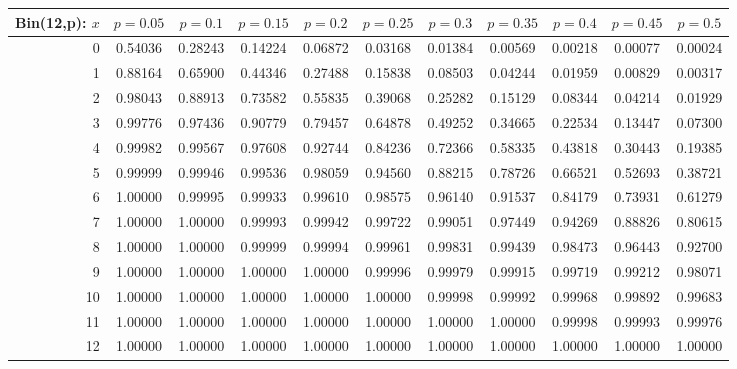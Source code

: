 \documentclass{article}
\begin{document}
{\vspace{8pt minus 6pt}
\begin{tabular}{@{\extracolsep{-2pt}}|r|c|c|c|c|c|c|c|c|c|c|}
\hline
Bin(12,p): $x$
   & $p\!=\!0.05$& $p\!=\!0.1$& $p\!=\!0.15$& $p\!=\!0.2$& $p\!=\!0.25$& $p\!=\!0.3$& $p\!=\!0.35$& $p\!=\!0.4$& $p\!=\!0.45$& $p\!=\!0.5$\\\hline
  0&0.54036&0.28243&0.14224&0.06872&0.03168&0.01384&0.00569&0.00218&0.00077&0.00024\\
  1&0.88164&0.65900&0.44346&0.27488&0.15838&0.08503&0.04244&0.01959&0.00829&0.00317\\
  2&0.98043&0.88913&0.73582&0.55835&0.39068&0.25282&0.15129&0.08344&0.04214&0.01929\\
  3&0.99776&0.97436&0.90779&0.79457&0.64878&0.49252&0.34665&0.22534&0.13447&0.07300\\
  4&0.99982&0.99567&0.97608&0.92744&0.84236&0.72366&0.58335&0.43818&0.30443&0.19385\\
  5&0.99999&0.99946&0.99536&0.98059&0.94560&0.88215&0.78726&0.66521&0.52693&0.38721\\
  6&1.00000&0.99995&0.99933&0.99610&0.98575&0.96140&0.91537&0.84179&0.73931&0.61279\\
  7&1.00000&1.00000&0.99993&0.99942&0.99722&0.99051&0.97449&0.94269&0.88826&0.80615\\
  8&1.00000&1.00000&0.99999&0.99994&0.99961&0.99831&0.99439&0.98473&0.96443&0.92700\\
  9&1.00000&1.00000&1.00000&1.00000&0.99996&0.99979&0.99915&0.99719&0.99212&0.98071\\
 10&1.00000&1.00000&1.00000&1.00000&1.00000&0.99998&0.99992&0.99968&0.99892&0.99683\\
 11&1.00000&1.00000&1.00000&1.00000&1.00000&1.00000&1.00000&0.99998&0.99993&0.99976\\
 12&1.00000&1.00000&1.00000&1.00000&1.00000&1.00000&1.00000&1.00000&1.00000&1.00000\\
\hline
\end{tabular}

}
\end{document}
